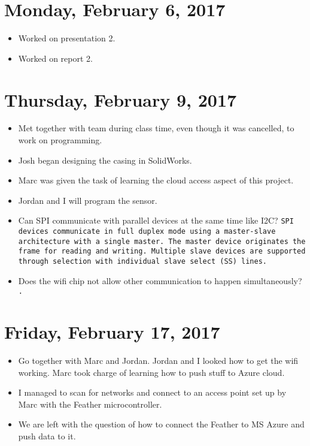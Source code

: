 \documentclass[12pt]{article}
\begin{document}
\section{Monday, February 6, 2017}
\begin{itemize}
\item Worked on presentation 2.
\item Worked on report 2.
\end{itemize}

\section{Thursday, February 9, 2017}
\begin{itemize}
\item Met together with team during class time, even though it was cancelled, to work on programming.
\item Josh began designing the casing in SolidWorks.
\item Marc was given the task of learning the cloud access aspect of this project.
\item Jordan and I will program the sensor.
\item Can SPI communicate with parallel devices at the same time like I2C? \texttt{SPI devices communicate in full duplex mode using a master-slave architecture with a single master. The master device originates the frame for reading and writing. Multiple slave devices are supported through selection with individual slave select (SS) lines.}
\item Does the wifi chip not allow other communication to happen simultaneously? \texttt{.}
\end{itemize}

\section{Friday, February 17, 2017}
\begin{itemize}
\item Go together with Marc and Jordan. Jordan and I looked how to get the wifi working. Marc took charge of learning how to push stuff to Azure cloud.
\item I managed to scan for networks and connect to an access point set up by Marc with the Feather microcontroller.
\item We are left with the question of how to connect the Feather to MS Azure and push data to it.
\end{itemize}
\end{document}
